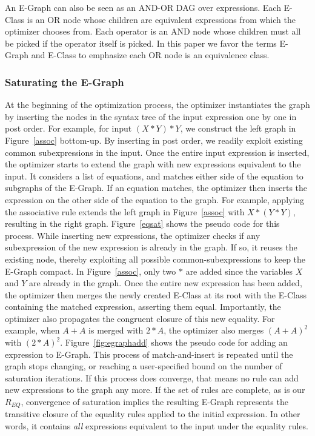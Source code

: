 An E-Graph can also be seen as an AND-OR DAG over expressions. Each E-Class is an OR node whose children are equivalent expressions from
which the optimizer chooses from. Each operator is an AND node whose children must all be picked if the operator itself is picked. In this paper we favor the terms E-Graph and E-Class to emphasize each OR node is an equivalence class. 

\subsubsection*{Saturating the E-Graph}
At the beginning of the optimization process, the optimizer instantiates the
graph by inserting the nodes in the syntax tree of the input expression one by
one in post order. For example, for input $(X*Y)*Y$, we construct the left graph
in Figure~\ref{assoc} bottom-up. By inserting in post order, we readily exploit
existing common subexpressions in the input. Once the entire input expression is
inserted, the optimizer starts to extend the graph with new expressions equivalent to
the input. It considers a list of equations, and matches either side of the
equation to subgraphs of the E-Graph. If an equation matches, the optimizer then
inserts the expression on the other side of the equation to the graph. For
example, applying the associative rule extends the left graph in
Figure~\ref{assoc} with $X*(Y*Y)$, resulting in the right graph.
Figure~\ref{eqsat} shows the pseudo code for this process. While inserting new
expressions, the optimizer checks if any subexpression of the new expression is
already in the graph. If so, it reuses the existing node, thereby exploiting all
possible common-subexpressions to keep the E-Graph compact. In
Figure~\ref{assoc}, only two $*$ are added since the variables $X$ and $Y$ are
already in the graph. Once the entire new expression has been added, the
optimizer then merges the newly created E-Class at its root with the E-Class
containing the matched expression, asserting them equal. Importantly, the
optimizer also propagates the congruent closure of this new equality. For
example, when $A+A$ is merged with $2*A$, the optimizer also merges $(A+A)^2$
with $(2*A)^2$. Figure~\ref{fig:egraphadd} shows the pseudo code for adding an
expression to E-Graph. This process of match-and-insert is repeated until the
graph stops changing, or reaching a user-specified bound on the number of 
saturation iterations. If this process does converge, that means no rule can add new
expressions to the graph any more. If the set of rules are complete, as is our
$R_{EQ}$, convergence of saturation implies the resulting E-Graph represents
the transitive closure of the equality rules applied to the initial expression.
In other words, it contains \textit{all} expressions equivalent to the input under the equality rules.

